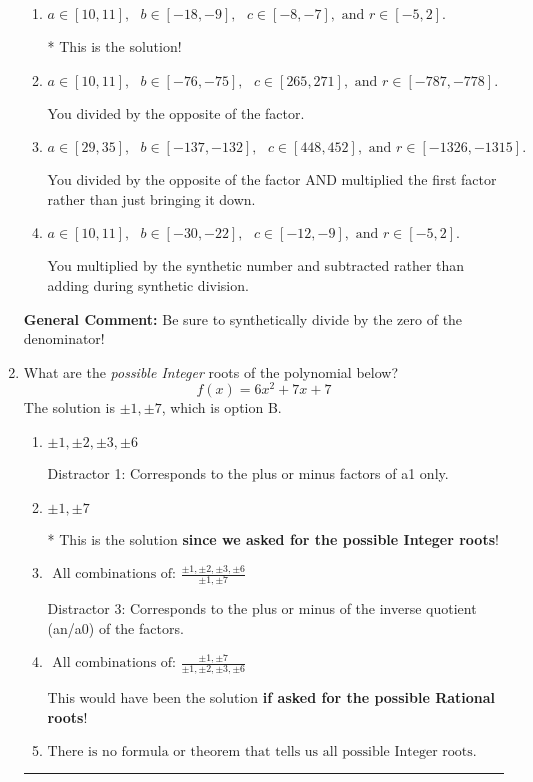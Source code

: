 \documentclass{extbook}[14pt]
\newcommand{\litem}[1]{\item #1

\rule{\textwidth}{0.4pt}}
\begin{document}
\begin{enumerate}
{\begin{enumerate}[label=\Alph*.]
 You multiplied by the synthetic number rather than bringing the first factor down.
\item \( a \in [10, 11], \text{   } b \in [-18, -9], \text{   } c \in [-8, -7], \text{   and   } r \in [-5, 2]. \)

* This is the solution!
\item \( a \in [10, 11], \text{   } b \in [-76, -75], \text{   } c \in [265, 271], \text{   and   } r \in [-787, -778]. \)

 You divided by the opposite of the factor.
\item \( a \in [29, 35], \text{   } b \in [-137, -132], \text{   } c \in [448, 452], \text{   and   } r \in [-1326, -1315]. \)

 You divided by the opposite of the factor AND multiplied the first factor rather than just bringing it down.
\item \( a \in [10, 11], \text{   } b \in [-30, -22], \text{   } c \in [-12, -9], \text{   and   } r \in [-5, 2]. \)

 You multiplied by the synthetic number and subtracted rather than adding during synthetic division.
\end{enumerate}

\textbf{General Comment:} Be sure to synthetically divide by the zero of the denominator!
}
\litem{
What are the \textit{possible Integer} roots of the polynomial below?
\[ f(x) = 6x^{2} +7 x + 7 \]The solution is \( \pm 1,\pm 7 \), which is option B.\begin{enumerate}[label=\Alph*.]
\item \( \pm 1,\pm 2,\pm 3,\pm 6 \)

 Distractor 1: Corresponds to the plus or minus factors of a1 only.
\item \( \pm 1,\pm 7 \)

* This is the solution \textbf{since we asked for the possible Integer roots}!
\item \( \text{ All combinations of: }\frac{\pm 1,\pm 2,\pm 3,\pm 6}{\pm 1,\pm 7} \)

 Distractor 3: Corresponds to the plus or minus of the inverse quotient (an/a0) of the factors. 
\item \( \text{ All combinations of: }\frac{\pm 1,\pm 7}{\pm 1,\pm 2,\pm 3,\pm 6} \)

This would have been the solution \textbf{if asked for the possible Rational roots}!
\item \( \text{There is no formula or theorem that tells us all possible Integer roots.} \)


\end{enumerate}}
\end{enumerate}
\end{document}
